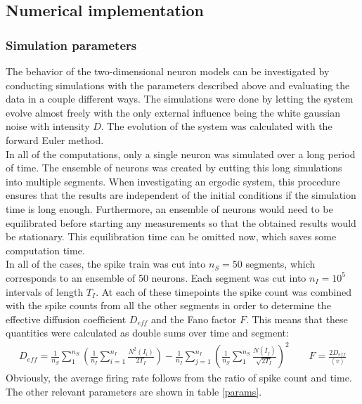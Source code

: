 \documentclass[12pt,a4paper]{article}
\begin{document}
\subsection{Numerical implementation}\label{numerics}
\subsubsection{Simulation parameters}
The behavior of the two-dimensional neuron models can be investigated by conducting simulations with the parameters described above and evaluating the data in a couple different ways. The simulations were done by letting the system evolve almost freely with the only external influence being the white gaussian noise with intensity $D$. The evolution of the system was calculated with the forward Euler method.\\
In all of the computations, only a single neuron was simulated over a long period of time. The ensemble of neurons was created by cutting this long simulations into multiple segments. When investigating an ergodic system, this procedure ensures that the results are independent of the initial conditions if the simulation time is long enough. Furthermore, an ensemble of neurons would need to be equilibrated before starting any measurements so that the obtained results would be stationary. This equilibration time can be omitted now, which saves some computation time. \\
In all of the cases, the spike train was cut into $n_S=50$ segments, which corresponds to an ensemble of 50 neurons. Each segment was cut into $n_I=10^5$ intervals of length $T_I$. At each of these timepoints the spike count was combined with the spike counts from all the other segments in order to determine the effective diffusion coefficient $D_{eff}$ and the Fano factor $F$. This means that these quantities were calculated as double sums over time and segment:
\begin{align*}
D_{eff}=\frac{1}{n_S}\sum_{1}^{n_S}\left(\frac{1}{n_I}\sum_{i=1}^{n_I}\frac{N^2(I_i)}{2T_I}\right)-\frac{1}{n_I}\sum_{j=1}^{n_I}\left(\frac{1}{n_S}\sum_{1}^{n_S}\frac{N(I_j)}{\sqrt{2T_I}}\right)^2\qquad F=\frac{2D_{eff}}{\left<v\right>}
\end{align*}
Obviously, the average firing rate follows from the ratio of spike count and time.\\
The other relevant parameters are shown in table \ref{params}.
\end{document}
